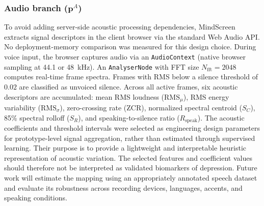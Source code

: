 \documentclass[10pt, conference, letterpaper]{IEEEtran}
\begin{document}
\subsubsection{Audio branch ($\mathbf{p}^A$)}
To avoid adding server-side acoustic processing dependencies, MindScreen
extracts signal descriptors in the client browser via the standard Web Audio
API. No deployment-memory comparison was measured for this design choice.
During voice input, the browser captures audio via an \texttt{AudioContext}
(native browser sampling at 44.1 or 48~kHz).
An \texttt{AnalyserNode} with FFT size $N_{\text{fft}} = 2048$ computes real-time
frame spectra. Frames with RMS below a silence threshold of $0.02$ are classified
as unvoiced silence.
Across all active frames, six acoustic descriptors are accumulated:
mean RMS loudness ($\text{RMS}_\mu$), RMS energy variability ($\text{RMS}_\sigma$),
zero-crossing rate ($\text{ZCR}$), normalized spectral centroid ($S_C$),
85\% spectral rolloff ($S_R$), and speaking-to-silence ratio ($R_{\text{speak}}$).
The acoustic coefficients and threshold intervals were selected as engineering
design parameters for prototype-level signal aggregation, rather than estimated
through supervised learning. Their purpose is to provide a lightweight and
interpretable heuristic representation of acoustic variation. The selected
features and coefficient values should therefore not be interpreted as validated
biomarkers of depression. Future work will estimate the mapping using an
appropriately annotated speech dataset and evaluate its robustness across
recording devices, languages, accents, and speaking conditions.
\end{document}
